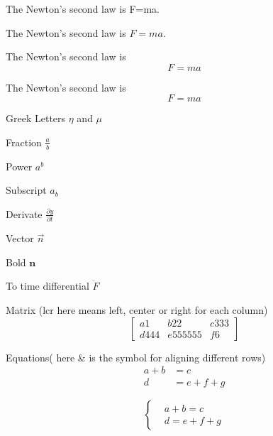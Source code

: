 \documentclass{article}
\begin{document}
	The Newton's second law is F=ma.

	The Newton's second law is $F=ma$.

	The Newton's second law is $$F=ma$$
 
	The Newton's second law is \[F=ma\]

	Greek Letters $\eta$ and $\mu$

	Fraction $\frac{a}{b}$

	Power $a^b$

	Subscript $a_b$

	Derivate $\frac{\partial y}{\partial t}$

	Vector $\vec{n}$

	Bold $\mathbf{n}$
	
	To time differential $\dot{F}$

	Matrix (lcr here means left, center or right for each column)
	\[
		\left[
			\begin{array}{lcr}
				a1 & b22 &c333 \\
				d444 & e555555&f6
			\end{array}
		\right]
	\]

	Equations( here \& is the symbol for aligning different rows)
	\begin{align}
		a+b&=c\\
		d&=e+f+g
	\end{align}
	
	\[ 
		\left\{
			\begin{aligned}
				&a+b=c\\
				&d=e+f+g
			\end{aligned}
		\right.
	\]
\end{document}
